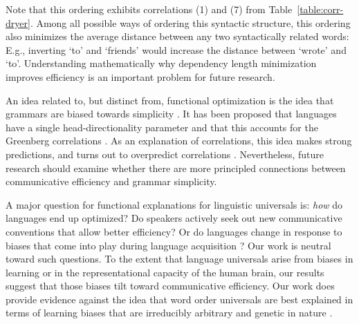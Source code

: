 \documentclass[9pt,twocolumn,twoside,lineno]{pnas-new}
\begin{document}
Note that this ordering exhibits correlations (1) and (7) from Table~\ref{table:corr-dryer}.
Among all possible ways of ordering this syntactic structure, this ordering also minimizes the average distance between any two syntactically related words: E.g., inverting `to' and `friends' would increase the distance between `wrote' and `to'.
Understanding mathematically why dependency length minimization  improves efficiency is an important problem for future research.


An idea related to, but distinct from, functional optimization is the idea that grammars are biased towards simplicity \cite{smith2013linguistic}. %
It has been proposed that languages have a single head-directionality parameter and that this accounts for the Greenberg correlations \cite{chomsky1988language}.
As an explanation of correlations, this idea makes strong predictions, and turns out to overpredict correlations \cite{dryer1992greenbergian}.
Nevertheless, future research should examine whether there are more principled connections between communicative efficiency and grammar simplicity.




A major question for functional explanations for linguistic universals is: \emph{how} do languages end up optimized? Do speakers actively seek out new communicative conventions that allow better efficiency? Or do languages change in response to biases that come into play during language acquisition \cite{fedzechkina2012language,culbertson2012learning}? Our work is neutral toward such questions. To the extent that language universals arise from biases in learning or in the representational capacity of the human brain, our results suggest that those biases tilt toward communicative efficiency. Our work does provide evidence against the idea that word order universals are best explained in terms of learning biases that are irreducibly arbitrary and genetic in nature \cite{chomsky2010some}.
\end{document}
